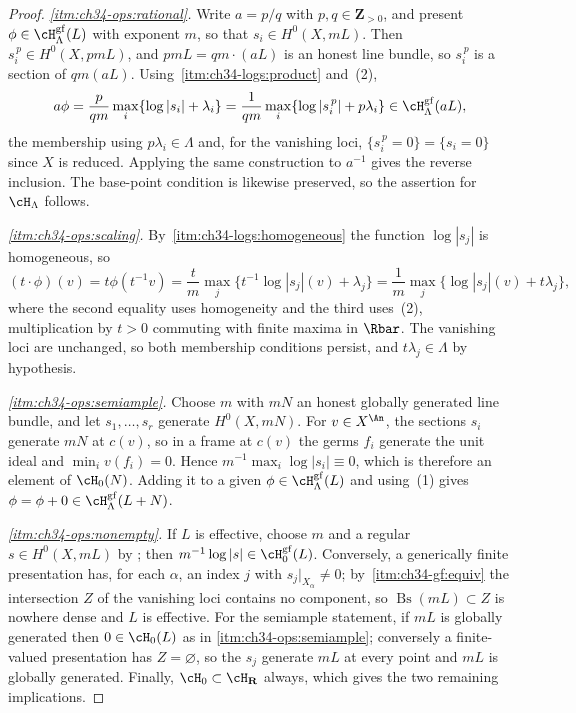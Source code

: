 \begin{proof}
\emph{\cref{itm:ch34-ops:rational}.}  Write $a=p/q$ with
$p,q\in\mathbf Z_{>0}$, and present
$\phi\in\cH^{\mathrm{gf}}_\Lambda(L)$ with exponent $m$, so that
$s_i\in H^0(X,mL)$.  Then $s_i^{\,p}\in H^0(X,pmL)$, and
$pmL=qm\cdot(aL)$ is an honest line bundle, so $s_i^{\,p}$ is a section
of $qm(aL)$.  Using
\,\cref{itm:ch34-logs:product} and
\,(2),
\[
 a\phi=\frac p{qm}\max_i\{\log|s_i|+\lambda_i\}
 =\frac1{qm}\max_i\{\log|s_i^{\,p}|+p\lambda_i\}
 \in\cH^{\mathrm{gf}}_{\Lambda}(aL),
\]
the membership using $p\lambda_i\in\Lambda$ and, for the vanishing loci,
$\{s_i^{\,p}=0\}=\{s_i=0\}$ since $X$ is reduced.  Applying the same
construction to $a^{-1}$ gives the reverse inclusion.  The base-point
condition is likewise preserved, so the assertion for $\cH_\Lambda$
follows.

\emph{\cref{itm:ch34-ops:scaling}.}  By
\,\cref{itm:ch34-logs:homogeneous} the
function $\log|s_j|$ is homogeneous, so
\[
 (t\cdot\phi)(v)=t\phi(t^{-1}v)
 =\frac tm\max_j\{t^{-1}\log|s_j|(v)+\lambda_j\}
 =\frac1m\max_j\{\log|s_j|(v)+t\lambda_j\},
\]
where the second equality uses homogeneity and the third uses
\,(2), multiplication by $t>0$ commuting with
finite maxima in $\Rbar$.  The vanishing loci are unchanged, so both
membership conditions persist, and $t\lambda_j\in\Lambda$ by hypothesis.

\emph{\cref{itm:ch34-ops:semiample}.}  Choose $m$ with $mN$ an honest
globally generated line bundle, and let $s_1,\ldots,s_r$ generate
$H^0(X,mN)$.  For $v\in X^{\An}$, the sections $s_i$ generate $mN$
at $c(v)$, so in a frame at $c(v)$ the germs $f_i$ generate the unit
ideal and $\min_iv(f_i)=0$.  Hence
$m^{-1}\max_i\log|s_i|\equiv0$, which is therefore an element of
$\cH_0(N)$.  Adding it to a given $\phi\in\cH^{\mathrm{gf}}_\Lambda(L)$
and using \,(1) gives
$\phi=\phi+0\in\cH^{\mathrm{gf}}_\Lambda(L+N)$.

\emph{\cref{itm:ch34-ops:nonempty}.}  If $L$ is effective, choose $m$ and
a regular $s\in H^0(X,mL)$ by ; then
$m^{-1}\log|s|\in\cH^{\mathrm{gf}}_0(L)$.  Conversely, a generically
finite presentation has, for each $\alpha$, an index $j$ with
$s_j|_{X_\alpha}\ne0$; by
\,\cref{itm:ch34-gf:equiv} the
intersection $Z$ of the vanishing loci contains no component, so
$\operatorname{Bs}(mL)\subset Z$ is nowhere dense and $L$ is effective.
For the semiample statement, if $mL$ is globally generated then
$0\in\cH_0(L)$ as in \cref{itm:ch34-ops:semiample}; conversely a
finite-valued presentation has $Z=\varnothing$, so the $s_j$ generate
$mL$ at every point and $mL$ is globally generated.  Finally,
$\cH_0\subset\cH_{\mathbf R}$ always, which gives the two remaining
implications.
\end{proof}

